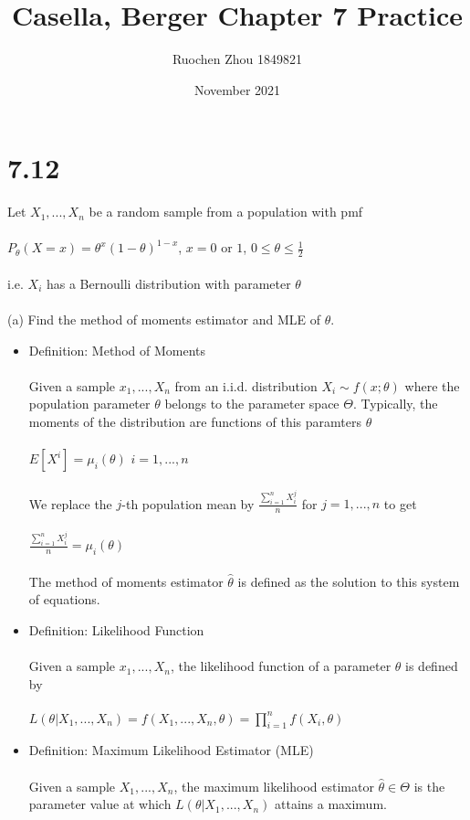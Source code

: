 \documentclass{article}
\title{Casella, Berger Chapter 7 Practice}
\author{Ruochen Zhou 1849821}
\date{November 2021}
\begin{document}
\maketitle

\section{7.12}
Let $X_1,...,X_n$ be a random sample from a population with pmf\\\\
$P_\theta(X=x)=\theta^x(1-\theta)^{1-x}$, $x=0$ or $1$, $0\leq\theta\leq\frac{1}{2}$\\\\
i.e. $X_i$ has a Bernoulli distribution with parameter $\theta$\\\\
(a) Find the method of moments estimator and MLE of $\theta$.
\begin{itemize}
    \item Definition: Method of Moments\\\\
    Given a sample $x_1,...,X_n$ from an i.i.d. distribution $X_i\sim f(x;\theta)$ where the population parameter $\theta$ belongs to the parameter space $\Theta$.  Typically, the moments of the distribution are functions of this paramters $\theta$\\\\
    $E[X^i]=\mu_i(\theta)$ $i=1,...,n$\\\\
    We replace the $j$-th population mean by $\frac{\sum_{i=1}^nX_i^j}{n}$ for $j=1,...,n$ to get \\\\
    $\frac{\sum_{i=1}^nX_i^j}{n}=\mu_i(\theta)$\\\\
    The method of moments estimator $\hat{\theta}$ is defined as the solution to this system of equations.
    \item Definition: Likelihood Function\\\\
    Given a sample $x_1,...,X_n$, the likelihood function of a parameter $\theta$ is defined by\\\\
    $L(\theta|X_1,...,X_n)=f(X_1,...,X_n,\theta)=\prod_{i=1}^nf(X_i,\theta)$
    \item Definition: Maximum Likelihood Estimator (MLE)\\\\
    Given a sample $X_1,...,X_n$, the maximum likelihood estimator $\hat{\theta}\in\Theta$ is the parameter value at which $L(\theta|X_1,...,X_n)$ attains a maximum.
\end{itemize}
\end{document}
